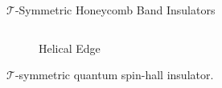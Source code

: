 \begin{frame}{$\mathcal{T}$-Symmetric Honeycomb Band Insulators}
\begin{columns}
\begin{column}[T]{0.35\textwidth}
{\begin{figure}
\caption{Helical Edge \footnotemark}
\end{figure}
\vskip-0.5cm
\bi 
\item $\mathcal{T}$-symmetric quantum spin-hall insulator.
\ei }
\end{column}
\end{columns}
\end{frame}